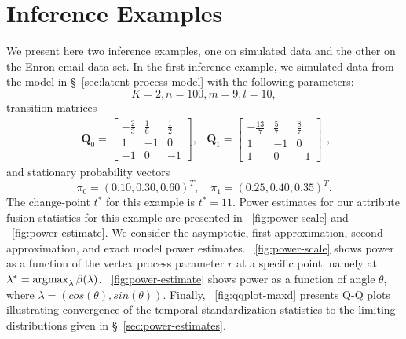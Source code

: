 \documentclass[10pt,draftclsnofoot,onecolumn]{IEEEtran}
\theoremstyle{definition}
\newcommand{\argmax}{\operatornamewithlimits{argmax}}
\begin{document}
\section{Inference Examples}
\label{sec:inference-examples}
We present here two inference examples, one on simulated data and the
other on the Enron email data set. In the first inference example, we
simulated data from the model in \S~\ref{sec:latent-process-model}
with the following parameters:
\begin{equation*}
  K = 2, n = 100, m = 9, l = 10,
\end{equation*}
transition matrices
\begin{equation*}
  \label{eq:55}
  \begin{matrix}
  \mathbf{Q}_0 = \begin{bmatrix}
    -\tfrac{2}{3} & \tfrac{1}{6} & \tfrac{1}{2} \\
    1 & -1 & 0 \\
    -1 & 0 & -1 
  \end{bmatrix},
  & \mathbf{Q}_1 = \begin{bmatrix}
    -\tfrac{13}{7} & \tfrac{5}{7} & \tfrac{8}{7} \\
    1 & -1 & 0 \\
    1 & 0 & -1
  \end{bmatrix}
  \end{matrix},
\end{equation*}
and stationary probability vectors
\begin{equation*}
  \pi_0 = (0.10,0.30,0.60)^{T}, \quad \pi_1 = (0.25,0.40,0.35)^{T}.
\end{equation*}
The change-point $t^{*}$ for this example is $t^{*} = 11$. 
Power estimates for our attribute fusion statistics for this example
are presented in \figurename~\ref{fig:power-scale} and
\figurename~\ref{fig:power-estimate}. We consider the asymptotic,
first approximation, second approximation, and exact model power
estimates. \figurename~\ref{fig:power-scale} shows power as a function
of the vertex process parameter $r$ at a specific point, namely at
$\lambda^{*} = \argmax_{\lambda} \beta(\lambda)$.
\figurename~\ref{fig:power-estimate} shows power as a function of
angle $\theta$, where $\lambda = (cos(\theta), sin(\theta))$. 
Finally, \figurename~\ref{fig:qqplot-maxd} presents Q-Q plots
illustrating convergence of the temporal standardization statistics to
the limiting distributions given in \S~\ref{sec:power-estimates}. 
\end{document}
